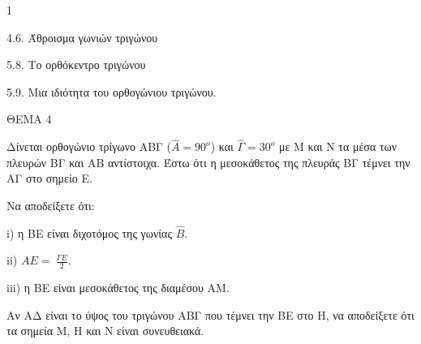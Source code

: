\begin{ylh}{1}
    \item 4.6. Άθροισμα γωνιών τριγώνου
    \item 5.8. Το ορθόκεντρο τριγώνου
    \item 5.9. Μια ιδιότητα του ορθογώνιου τριγώνου.
\end{ylh}

ΘΕΜΑ 4

Δίνεται ορθογώνιο τρίγωνο ΑΒΓ ($\widehat{Α} = 90^{ο}$) και $\widehat{\Gamma} = 30^{ο}$ με Μ και Ν τα μέσα των πλευρών ΒΓ και ΑΒ αντίστοιχα. Έστω ότι η μεσοκάθετος της πλευράς ΒΓ τέμνει την ΑΓ στο σημείο Ε.

\begin{alist}
\item Να αποδείξετε ότι:

i) η ΒΕ είναι διχοτόμος της γωνίας $\widehat{Β}$. 

ii) $ΑΕ = \ \frac{\Gamma Ε}{2}$. 

iii) η ΒΕ είναι μεσοκάθετος της διαμέσου ΑΜ. 

\item Αν ΑΔ είναι το ύψος του τριγώνου ΑΒΓ που τέμνει την ΒΕ στο Η, να αποδείξετε ότι τα σημεία Μ, Η και Ν είναι συνευθειακά. 


\end{alist}
